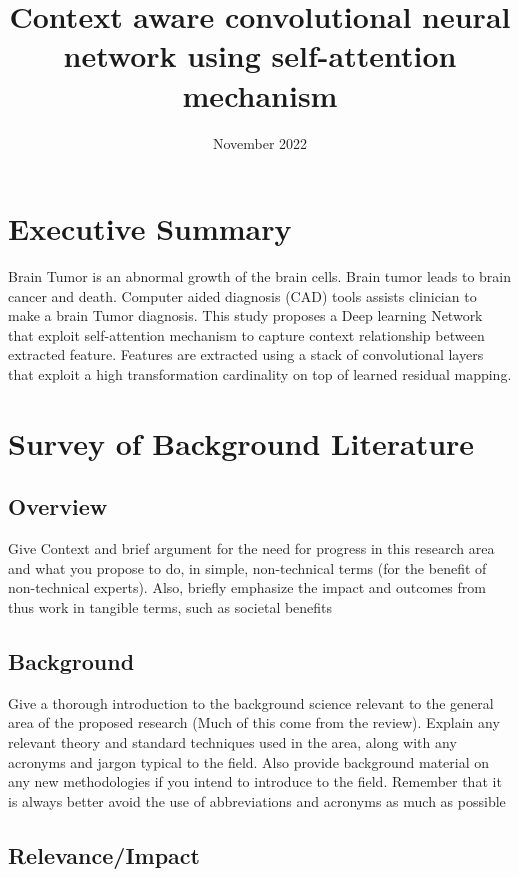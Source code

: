 \documentclass{article}
\title{Context aware convolutional neural network using self-attention mechanism }
\date{November 2022}
\begin{document}
\maketitle


\section{Executive Summary}

Brain Tumor is an abnormal growth of the brain cells. Brain tumor leads to brain cancer and death. Computer aided diagnosis (CAD) tools assists clinician to make a brain Tumor diagnosis.
This study proposes a Deep learning Network that exploit self-attention mechanism to capture context relationship between extracted feature. Features are extracted using a stack of convolutional layers that exploit a high transformation cardinality on top of learned residual mapping.


\section{Survey of Background Literature}

\subsection{Overview}

Give Context and brief argument for the need for progress in this research area and what you propose to do, in simple, non-technical terms (for the benefit of non-technical experts). Also, briefly emphasize the impact and outcomes from thus work in tangible terms, such as societal benefits
\subsection{Background}

Give a thorough introduction to the background science relevant to the general area of the proposed research (Much of this come from the review). Explain any relevant theory and standard techniques used in the area, along with any acronyms and jargon typical to the field. Also provide background material on any new methodologies if you intend to introduce to the field. Remember that it is always better avoid the use of abbreviations and acronyms as much as possible

\subsection{Relevance/Impact}
\end{document}
